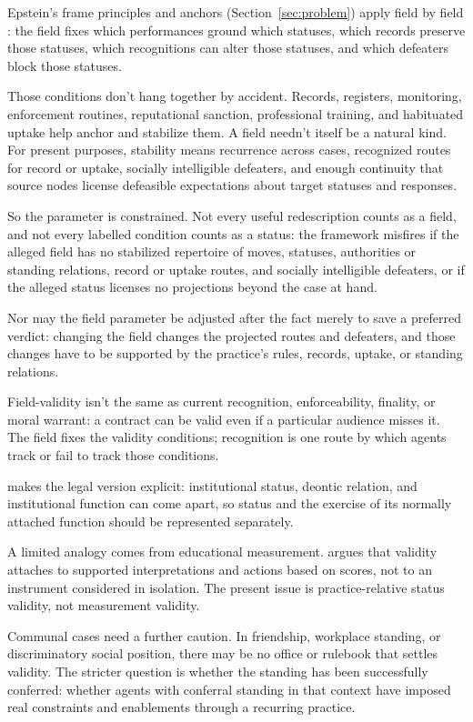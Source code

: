 \documentclass[12pt]{article}
\begin{document}
Epstein's frame principles and anchors (Section~\ref{sec:problem}) apply field by field \citep{epstein2015AntTrap}: the field fixes which performances ground which statuses, which records preserve those statuses, which recognitions can alter those statuses, and which defeaters block those statuses.

Those conditions don't hang together by accident. Records, registers, monitoring, enforcement routines, reputational sanction, professional training, and habituated uptake help anchor and stabilize them. A field needn't itself be a natural kind. For present purposes, stability means recurrence across cases, recognized routes for record or uptake, socially intelligible defeaters, and enough continuity that source nodes license defeasible expectations about target statuses and responses.

So the parameter is constrained. Not every useful redescription counts as a field, and not every labelled condition counts as a status: the framework misfires if the alleged field has no stabilized repertoire of moves, statuses, authorities or standing relations, record or uptake routes, and socially intelligible defeaters, or if the alleged status licenses no projections beyond the case at hand.

Nor may the field parameter be adjusted after the fact merely to save a preferred verdict: changing the field changes the projected routes and defeaters, and those changes have to be supported by the practice's rules, records, uptake, or standing relations.

Field-validity isn't the same as current recognition, enforceability, finality, or moral warrant: a contract can be valid even if a particular audience misses it. The field fixes the validity conditions; recognition is one route by which agents track or fail to track those conditions.

\textcite[pp.~6--8]{almang2016LegalFacts} makes the legal version explicit: institutional status, deontic relation, and institutional function can come apart, so status and the exercise of its normally attached function should be represented separately.

A limited analogy comes from educational measurement. \textcite{messick1995Validity} argues that validity attaches to supported interpretations and actions based on scores, not to an instrument considered in isolation. The present issue is practice-relative status validity, not measurement validity.

Communal cases need a further caution. In friendship, workplace standing, or discriminatory social position, there may be no office or rulebook that settles validity. The stricter question is whether the standing has been successfully conferred: whether agents with conferral standing in that context have imposed real constraints and enablements through a recurring practice.
\end{document}
